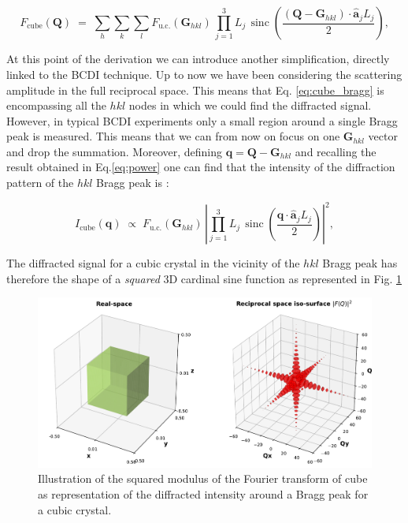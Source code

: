 \begin{equation}
    F_{\text{cube}}(\mathbf Q) \;=\; 
    \sum_{h} \sum_{k} \sum_{l} F_{\text{u.c.}}(\mathbf{G}_{hkl})\,
    \prod_{j=1}^{3} L_j \,\!\operatorname{sinc}\left(\frac{(\mathbf{Q}- \mathbf{G}_{hkl}) \cdot \mathbf{\hat{a}}_j L_j}{2}\right),
    \label{eq:cube_bragg}
\end{equation}

At this point of the derivation we can introduce another simplification, directly linked to the BCDI technique.
Up to now we have been considering the scattering amplitude in the full reciprocal space. This means that Eq. \ref{eq:cube_bragg}
is encompassing all the $hkl$ nodes in which we could find the diffracted signal. However, in typical BCDI experiments 
only a small region around a single Bragg peak is measured. This means that we can from now on focus on one $\mathbf{G}_{hkl}$ 
vector and drop the summation.  Moreover, defining $\mathbf q = \mathbf{Q}- \mathbf{G}_{hkl}$ and recalling the result obtained in Eq.\ref{eq:power} 
one can find that the intensity of the diffraction pattern of the $hkl$ Bragg peak is : 

\begin{equation}
    I_{\text{cube}}(\mathbf q) \;\propto\; 
    F_{\text{u.c.}}(\mathbf{G}_{hkl})\,
    \left | \prod_{j=1}^{3} L_j \,\!\operatorname{sinc}\left(\frac{\mathbf{q} \cdot \mathbf{\hat{a}}_j L_j}{2}\right)\right|^2,
    \label{eq:cube_bragg2}
\end{equation}



The diffracted signal for a cubic crystal in the vicinity of the $hkl$ Bragg peak has therefore 
the shape of a \textit{squared} 3D cardinal sine function as represented in Fig. \ref{fig:cube}

\begin{figure}[H]
    \centering
    \includegraphics[width=\textwidth]{figures/Intro/cube1.pdf}
    \caption{Illustration of the squared modulus of the Fourier transform of cube as representation of the diffracted 
    intensity around a Bragg peak for a cubic crystal. }
    \label{fig:cube}
\end{figure}

